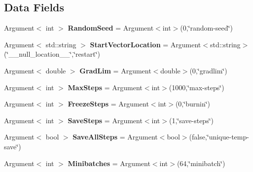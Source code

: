 \subsection*{Data Fields}
\begin{DoxyCompactItemize}
\item 
\mbox{\label{classCommandArgs_a7227f10097dae1825feea951fc3132a6}} 
Argument$<$ int $>$ {\bfseries Random\+Seed} = Argument$<$int$>$(0,\char`\"{}random-\/seed\char`\"{})
\item 
\mbox{\label{classCommandArgs_acaf9e3be3c41eeb7f3fe61d26312a0ad}} 
Argument$<$ std\+::string $>$ {\bfseries Start\+Vector\+Location} = Argument$<$std\+::string$>$(\char`\"{}\+\_\+\+\_\+null\+\_\+location\+\_\+\+\_\+\char`\"{},\char`\"{}restart\char`\"{})
\item 
\mbox{\label{classCommandArgs_a47a53ea373bc6c81ed80c2b651e9c405}} 
Argument$<$ double $>$ {\bfseries Grad\+Lim} = Argument$<$double$>$(0,\char`\"{}gradlim\char`\"{})
\item 
\mbox{\label{classCommandArgs_a9d8b6a8c21f7b330979c7a173994ca37}} 
Argument$<$ int $>$ {\bfseries Max\+Steps} = Argument$<$int$>$(1000,\char`\"{}max-\/steps\char`\"{})
\item 
\mbox{\label{classCommandArgs_aedd3311893f45b92b4a7f598792f7f2e}} 
Argument$<$ int $>$ {\bfseries Freeze\+Steps} = Argument$<$int$>$(0,\char`\"{}burnin\char`\"{})
\item 
\mbox{\label{classCommandArgs_af906f01863ff7b503914b462a8a7ddb5}} 
Argument$<$ int $>$ {\bfseries Save\+Steps} = Argument$<$int$>$(1,\char`\"{}save-\/steps\char`\"{})
\item 
\mbox{\label{classCommandArgs_ad1018830dc6772a972df87a843059416}} 
Argument$<$ bool $>$ {\bfseries Save\+All\+Steps} = Argument$<$bool$>$(false,\char`\"{}unique-\/temp-\/save\char`\"{})
\item 
\mbox{\label{classCommandArgs_ad16d6cadaedb80e8d3abfc51b3b73335}} 
Argument$<$ int $>$ {\bfseries Minibatches} = Argument$<$int$>$(64,\char`\"{}minibatch\char`\"{})
\item 

\end{DoxyCompactItemize}
